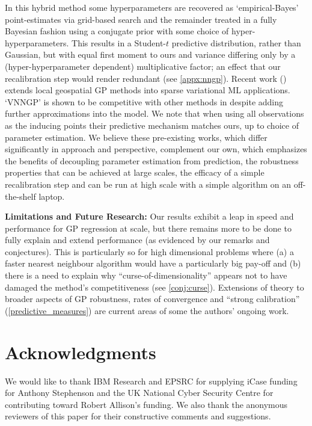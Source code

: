 %
In this hybrid method some hyperparameters are recovered as `empirical-Bayes' point-estimates via grid-based search and the remainder treated in a fully Bayesian fashion using a conjugate prior with some choice of hyper-hyperparameters. This results in a Student-\(t\) predictive distribution, rather than Gaussian, but with equal first moment to ours and variance differing only by a (hyper-hyperparameter dependent) multiplicative factor; an effect that our recalibration step would render redundant (see \ref{appx:nngp}). 
Recent work (\cite{Tran2020,Wu2022}) extends local geospatial GP methods into sparse variational ML applications. `VNNGP' is shown to be competitive with other methods in \cite{Wu2022} despite adding further approximations into the model. We note that when using all observations as the inducing points their predictive mechanism matches ours, up to choice of parameter estimation.
We believe these pre-existing works, which differ significantly in approach and perspective, complement our own, which emphasizes the benefits of decoupling parameter estimation from prediction, the robustness properties that can be achieved at large scales, the efficacy of a simple recalibration step and can be run at high scale with a simple algorithm on an off-the-shelf laptop.

 

\textbf{Limitations and Future Research:} Our results exhibit a leap in speed and performance for GP regression at scale, but there remains more to be done to fully explain and extend performance (as evidenced by our remarks and conjectures). This is particularly so for high dimensional problems where (a) a faster nearest neighbour algorithm would have a particularly big pay-off and (b) there is a need to explain why ``curse-of-dimensionality'' appears not to have damaged the method's competitiveness (see \autoref{conj:curse}). Extensions of theory to broader aspects of GP robustness, rates of convergence and ``strong calibration'' (\autoref{predictive_measures}) are current areas of some the authors' ongoing work.


\section*{Acknowledgments}
We would like to thank IBM Research and EPSRC for supplying iCase funding for Anthony Stephenson and the UK National Cyber Security Centre for contributing toward Robert Allison's funding. We also thank the anonymous reviewers of this paper for their constructive comments and suggestions.





\nocite{*}
